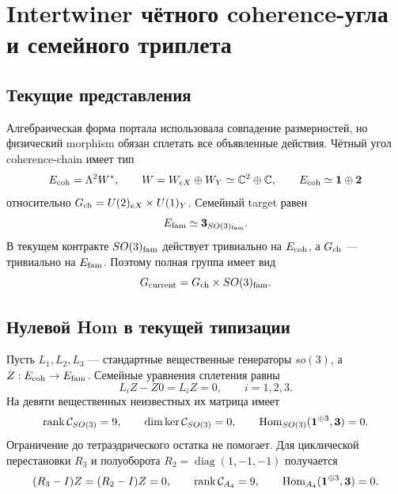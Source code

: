 \chapter{Intertwiner чётного coherence-угла и семейного триплета}
\label{ch:v8-baryon-c0-coherence-even-corner-family-triplet-intertwiner}

\section{Текущие представления}

Алгебраическая форма портала использовала совпадение размерностей, но
физический morphism обязан сплетать все объявленные действия. Чётный угол
coherence-chain имеет тип
\begin{equation}
 E_{\rm coh}=\Lambda^2W^*,
 \qquad
 W=W_{eX}\oplus W_Y\simeq\mathbb C^2\oplus\mathbb C,
 \qquad
 E_{\rm coh}\simeq\mathbf1\oplus\mathbf2
 \label{eq:v8-coherence-family-intertwiner-source-type}
\end{equation}
относительно $G_{\rm ch}=U(2)_{eX}\times U(1)_Y$. Семейный target равен
\begin{equation}
 E_{\rm fam}\simeq\mathbf3_{SO(3)_{\rm fam}}.
 \label{eq:v8-coherence-family-intertwiner-target-type}
\end{equation}
В текущем контракте $SO(3)_{\rm fam}$ действует тривиально на
$E_{\rm coh}$, а $G_{\rm ch}$ --- тривиально на $E_{\rm fam}$. Поэтому
полная группа имеет вид
\begin{equation}
 G_{\rm current}=G_{\rm ch}\times SO(3)_{\rm fam}.
 \label{eq:v8-coherence-family-intertwiner-product-group}
\end{equation}

\section{Нулевой Hom в текущей типизации}

Пусть $L_1,L_2,L_3$ --- стандартные вещественные генераторы $so(3)$, а
$Z:E_{\rm coh}\to E_{\rm fam}$. Семейные уравнения сплетения равны
\begin{equation}
 L_iZ-Z0=L_iZ=0,
 \qquad i=1,2,3.
 \label{eq:v8-coherence-family-current-so3-system}
\end{equation}
На девяти вещественных неизвестных их матрица имеет
\begin{equation}
 \operatorname{rank}\mathcal C_{SO(3)}=9,
 \qquad
 \dim\ker\mathcal C_{SO(3)}=0,
 \qquad
 \operatorname{Hom}_{SO(3)}(\mathbf1^{\oplus3},\mathbf3)=0.
 \label{eq:v8-coherence-family-current-so3-hom}
\end{equation}
Ограничение до тетраэдрического остатка не помогает. Для циклической
перестановки $R_3$ и полуоборота $R_2=\operatorname{diag}(1,-1,-1)$
получается
\begin{equation}
 (R_3-I)Z=(R_2-I)Z=0,
 \qquad
 \operatorname{rank}\mathcal C_{A_4}=9,
 \qquad
 \operatorname{Hom}_{A_4}(\mathbf1^{\oplus3},\mathbf3)=0.
 \label{eq:v8-coherence-family-current-a4-hom}
\end{equation}

